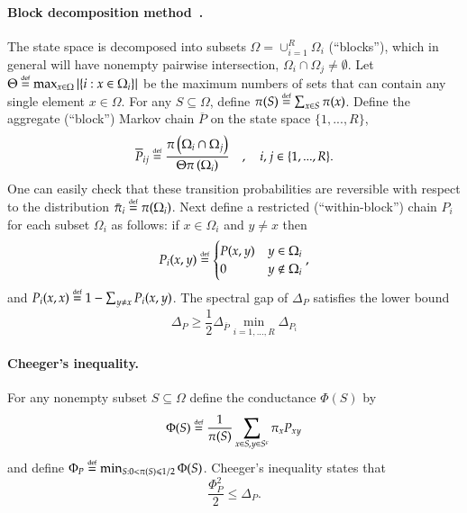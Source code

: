 \documentclass[11pt,letterpaper]{article}
\theoremstyle{definition}
\theoremstyle{remark}
\newcommand{\defeq}{\stackrel{\mbox{\normalfont\tiny def}}=}
\renewcommand{\leq}{\leqslant}
\renewcommand{\geq}{\geqslant}
\numberwithin{equation}{section}
\let\origparagraph\paragraph
\renewcommand{\paragraph}[1]{\origparagraph{#1.}}
\theoremstyle{definition}
\begin{document}
\paragraph{Block decomposition method~\cite{madras2002}}  The state space is decomposed into subsets $\Omega = \cup_{i=1}^R \Omega_i$ (``blocks''), which in general will have nonempty pairwise intersection, $\Omega_i \cap \Omega_j \neq \emptyset$.  Let $\Theta \defeq \max_{x \in \Omega} |\{i : x \in \Omega_i\}|$ be the maximum numbers of sets that can contain any single element $x \in \Omega$.  For any $S \subseteq \Omega$, define $\pi(S) \defeq \sum_{x \in S} \pi(x)$.  Define the aggregate (``block'') Markov chain $\overline{P}$ on the state space $\{1,...,R\}$,
\begin{equation}
\overline{P}_{ij} \defeq \frac{\pi\left(\Omega_i \cap \Omega_j\right)}{\Theta \pi\left(\Omega_i\right)} \quad , \quad i,j \in \{1,...,R\}. \label{eq:aggP}
\end{equation}
One can easily check that these transition probabilities are reversible with respect to the distribution $\bar{\pi}_i \defeq \pi(\Omega_i)$.  Next define a restricted (``within-block'') chain $P_i$ for each subset $\Omega_i$ as follows: if $x \in \Omega_i$ and $ y \neq x$ then
\begin{equation}
P_{i}(x,y) \defeq  \begin{cases} 
      P(x,y) & y \in \Omega_i \\
      0 & y \notin \Omega_i 
   \end{cases}, \label{eq:prestricted}
\end{equation}
and $P_{i}(x,x) \defeq 1 - \sum_{y \neq x} P_{i}(x,y)$.  The spectral gap of $\Delta_P$ satisfies the lower bound
\begin{equation}
\Delta_P \geq \frac{1}{2} \Delta_{\overline{P}} \min_{i = 1,...,R} \Delta_{P_i}
\end{equation}
\paragraph{Cheeger's inequality}  
For any nonempty subset $S\subseteq \Omega$ define the conductance $\Phi(S)$ by
\begin{equation}
\Phi(S) \defeq \frac{1}{\pi(S)}\sum_{x \in S , y \in S^c} \pi_x P_{xy}
\end{equation}
and define $\Phi_P \defeq \min_{S : 0 < \pi(S) \leq 1/2}\Phi(S)$.  Cheeger's inequality states that
\begin{equation}
\frac{\Phi_P^2}{2} \leq \Delta_P.
\end{equation}
\end{document}
